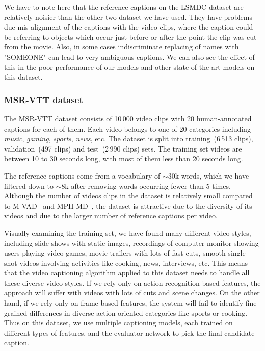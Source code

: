 We have to note here that the reference captions on the LSMDC dataset are
relatively noisier than the other two dataset we have used.
They have problems due mis-alignment of the captions with the video clips,
where the caption could be referring to objects which occur just before or after
the point the clip was cut from the movie. 
Also, in some cases indiscriminate replacing of names with "SOMEONE" can lead to
very ambiguous captions.
We can also see the effect of this in the poor performance of our models and other
state-of-the-art models on this dataset.

\subsubsection{MSR-VTT dataset}
The MSR-VTT dataset consists of 10\,000 video clips with 20 human-annotated
captions for each of them.
Each video belongs to one of 20 categories including \emph{music},
\emph{gaming}, \emph{sports}, \emph{news}, etc.
The dataset is split into training~(6\,513 clips), validation~(497 clips) and
test~(2\,990 clips) sets. 
The training set videos are between 10 to 30 seconds long, with most of them
less than 20 seconds long.

The reference captions come from a vocabulary of $\sim$30k words, which we have
filtered down to $\sim$8k after removing words occurring fewer than 5 times.
Although the number of videos clips in the dataset is relatively small compared
to M-VAD~\cite{rohrbach15cvpr} and MPII-MD~\cite{AtorabiM-VAD2015}, the dataset
is attractive due to the diversity of its videos and due to the larger number of
reference captions per video.

Visually examining the training set, we have found many different video styles,
including slide shows with static images, recordings of computer monitor showing
users playing video games, movie trailers with lots of fast cuts, smooth single
shot videos involving activities like cooking, news, interviews, etc.
This means that the video captioning algorithm applied to this dataset needs to
handle all these diverse video styles.
If we rely only on action recognition based features, the approach will suffer
with videos with lots of cuts and scene changes.
On the other hand, if we rely only on frame-based features, the system will fail
to identify fine-grained differences in diverse action-oriented categories like
sports or cooking.
Thus on this dataset, we use multiple captioning models, each trained on
different types of features, and the evaluator network to pick the final
candidate caption.
